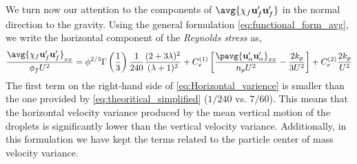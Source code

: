 We turn now our attention to the components of $\avg{\chi_f\textbf{u}_f'\textbf{u}_f'}$ in the normal direction to the gravity. 
Using the general formulation \ref{eq:functional_form_avg}, we write the horizontal component of the \textit{Reynolds stress} as, 
\begin{equation}
    \frac{\avg{\chi_f \textbf{u}_f'\textbf{u}_f'}_{xx}}{\phi_f U^2}
    = \phi^{2/3}\Gamma\left(\frac{1}{3}\right) \frac{1}{240}\frac{(2+3\lambda)^2 }{(\lambda+1)^2}
    + 
    C^{(1)}_e \left[
    \frac{\pavg{\textbf{u}_\alpha'\textbf{u}_\alpha'}_{xx}}{n_p U^2}
    - \frac{2k_p}{3U^2}  
    \right]
    + C^{(2)}_e
    \frac{2k_p}{U^2}  
    \label{eq:Horizontal_varience}
\end{equation}
The first term on the right-hand side of \ref{eq:Horizontal_varience} is smaller than the one provided by \ref{eq:theoritical_simplified} ($1/240$ vs. $7/60$). 
This means that the horizontal velocity variance produced by the mean vertical motion of the droplets is significantly lower than the vertical velocity variance. 
Additionally, in this formulation we have kept the terms related to the particle center of mass velocity variance. 


